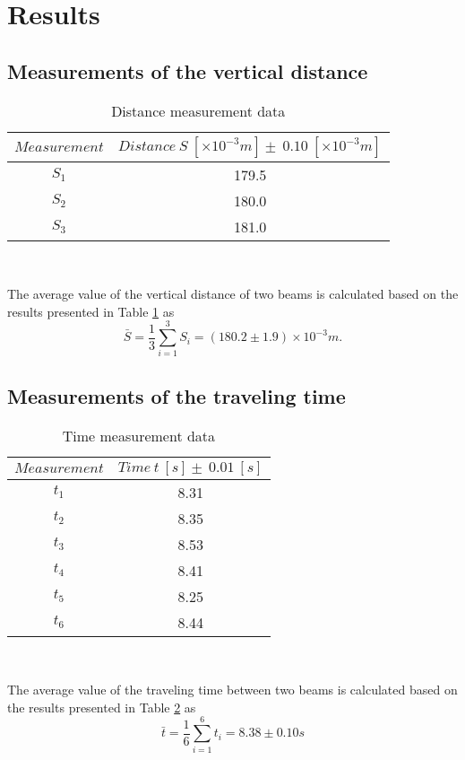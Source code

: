 \section{Results}
\subsection{Measurements of the vertical distance}
    \begin{table}[htbp]
        \centering
        \begin{tabular}{cc}
            \hline
            $Measurement$ & $Distance\ S\ [\times10^{-3}m] \pm\ 0.10\ [\times10^{-3}m]$\\
            \hline
            $S_1$ & 179.5\\
            $S_2$ & 180.0\\
            $S_3$ & 181.0\\     
            \hline
        \end{tabular}\\
        \caption{Distance measurement data}
        \label{distance}
    \end{table}
    The average value of the vertical distance of two beams is calculated  based on the results presented in Table \ref{distance} as
    \[
        \bar{S}=\frac{1}{3}\sum_{i=1}^{3}S_i=(180.2\pm 1.9)\times10^{-3}m.
    \]

\subsection{Measurements of the traveling time}
    \begin{table}[htbp]
        \centering
        \begin{tabular}{cc}
            \hline
            $Measurement$ & $Time\ t\ [s] \pm\ 0.01\ [s]$\\
            \hline
            $t_1$ & 8.31\\
            $t_2$ & 8.35\\
            $t_3$ & 8.53\\
            $t_4$ & 8.41\\
            $t_5$ & 8.25\\
            $t_6$ & 8.44\\
            \hline
        \end{tabular}\\
        \caption{Time measurement data}
        \label{time}
    \end{table}
    The average value of the traveling time between two beams is calculated  based on the results presented in Table \ref{time} as
    \[
        \bar{t}=\frac{1}{6}\sum_{i=1}^{6}t_i=8.38\pm 0.10s
    \]

